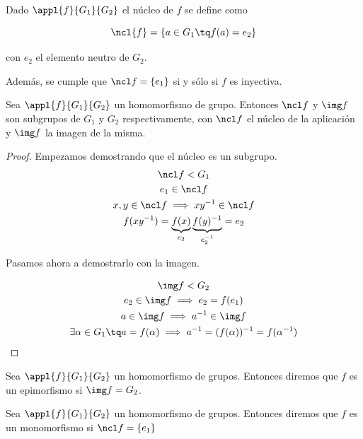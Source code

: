 \documentclass[nochap]{apuntes}
\begin{document}
\begin{defn}
Dado $\appl{f}{G_1}{G_2}$ el núcleo de $f$ se define como 

\[ \ncl{f} = \{ a\in G_1 \tq f(a) = e_2\} \]

con $e_2$ el elemento neutro de $G_2$. 

Además, se cumple que $\ncl f = \{ e_1 \}$ si y sólo si $f$ es inyectiva.
\end{defn}

\begin{theorem}
 Sea $\appl{f}{G_1}{G_2}$ un homomorfismo de grupo. Entonces $\ncl f$ y $\img f$ son subgrupos de $G_1$ y $G_2$ respectivamente, con $\ncl f$ el núcleo de la aplicación y $\img f$ la imagen de la misma.
 \end{theorem}
 
 \begin{proof} Empezamos demostrando que el núcleo es un subgrupo.
 \begin{gather*}
  \ncl f < G_1 \\
 e_1 \in \ncl f \\
 x, y \in \ncl f \implies xy^{-1}\in \ncl f \\
 f(xy^{-1}) = \underbrace{f(x)}_{e_2} \underbrace{f(y)^{-1}}_{e_2^{-1}} = e_2
 \end{gather*}
 
Pasamos ahora a demostrarlo con la imagen.

\begin{gather*}
\img f < G_2 \\
 e_2\in \img f \implies e_2 = f(e_1)\\
 a\in \img f \implies a^{-1}\in \img f\\
 \exists \alpha \in G_1 \tq a=f(\alpha ) \implies a^{-1} = (f(\alpha ))^{-1} = f(\alpha ^{-1})
 \end{gather*}
 
 \end{proof}

\begin{defn}[Epimorfismo]
Sea $\appl{f}{G_1}{G_2}$ un homomorfismo de grupos. Entonces diremos que $f$ es un epimorfismo si $\img f = G_2$.
\end{defn}

\begin{defn}[Monomorfismo]
Sea $\appl{f}{G_1}{G_2}$ un homomorfismo de grupos. Entonces diremos que $f$ es un monomorfismo si $\ncl f = \{ e_1\} $
\end{defn}
\end{document}
